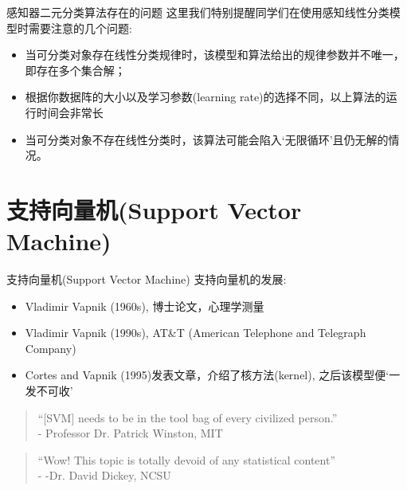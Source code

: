 \documentclass[handout]{ctexbeamer}
\begin{document}
\begin{frame}{感知器二元分类算法存在的问题}
	这里我们特别提醒同学们在使用感知线性分类模型时需要注意的几个问题: 
		\begin{itemize}
			\item 当可分类对象存在线性分类规律时，该模型和算法给出的规律参数并不唯一，即存在多个集合解；
			\item 根据你数据阵的大小以及学习参数(learning rate)的选择不同，以上算法的运行时间会非常长
			\item 当可分类对象不存在线性分类时，该算法可能会陷入`无限循环'且仍无解的情况。
		\end{itemize}
\end{frame}



\section{支持向量机(Support Vector Machine)}

\begin{frame}{支持向量机(Support Vector Machine)}
支持向量机的发展:
\begin{itemize}
	\item Vladimir Vapnik (1960s), 博士论文，心理学测量
	\item Vladimir Vapnik (1990s), AT\&T (American Telephone and Telegraph Company)
	\item Cortes and Vapnik (1995)发表文章，介绍了核方法(kernel), 之后该模型便`一发不可收'
	\end{itemize}
	
	\begin{quote}
		``[SVM] needs to be in the tool bag of every civilized person.'' \\
		\hfill - Professor Dr. Patrick Winston, MIT
	\end{quote}
	
	\begin{quote}
		``Wow! This topic is totally devoid of any statistical content'' \\
		\hfill - -Dr. David Dickey, NCSU
	\end{quote}
\end{frame}
\end{document}
